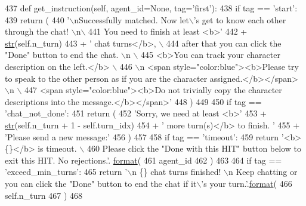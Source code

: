 \begin{DoxyCode}
437     \textcolor{keyword}{def }get\_instruction(self, agent\_id=None, tag='first'):
438         \textcolor{keywordflow}{if} tag == \textcolor{stringliteral}{'start'}:
439             \textcolor{keywordflow}{return} (
440                 \textcolor{stringliteral}{'\(\backslash\)nSuccessfully matched. Now let\(\backslash\)'s get to know each other through the chat! \(\backslash\)n\(\backslash\)}
441 \textcolor{stringliteral}{                    You need to finish at least <b>'}
442                 + \hyperlink{namespacegenerate__task__READMEs_a5b88452ffb87b78c8c85ececebafc09f}{str}(self.n\_turn)
443                 + \textcolor{stringliteral}{' chat turns</b>, \(\backslash\)}
444 \textcolor{stringliteral}{                    after that you can click the "Done" button to end the chat. \(\backslash\)n \(\backslash\)}
445 \textcolor{stringliteral}{                    <b>You can track your character description on the left.</b> \(\backslash\)}
446 \textcolor{stringliteral}{                    \(\backslash\)n <span style="color:blue"><b>Please try to speak to the other person as if you are
       the character assigned.</b></span> \(\backslash\)n \(\backslash\)}
447 \textcolor{stringliteral}{                    <span style="color:blue"><b>Do not trivially copy the character descriptions into the
       message.</b></span>'}
448             )
449 
450         \textcolor{keywordflow}{if} tag == \textcolor{stringliteral}{'chat\_not\_done'}:
451             \textcolor{keywordflow}{return} (
452                 \textcolor{stringliteral}{'Sorry, we need at least <b>'}
453                 + \hyperlink{namespacegenerate__task__READMEs_a5b88452ffb87b78c8c85ececebafc09f}{str}(self.n\_turn + 1 - self.turn\_idx)
454                 + \textcolor{stringliteral}{' more turn(s)</b> to finish. '}
455                 + \textcolor{stringliteral}{'Please send a new message:'}
456             )
457 
458         \textcolor{keywordflow}{if} tag == \textcolor{stringliteral}{'timeout'}:
459             \textcolor{keywordflow}{return} \textcolor{stringliteral}{'<b>\{\}</b> is timeout. \(\backslash\)}
460 \textcolor{stringliteral}{                    Please click the "Done with this HIT" button below to exit this HIT. No rejections.'}.
      \hyperlink{namespaceparlai_1_1chat__service_1_1services_1_1messenger_1_1shared__utils_a32e2e2022b824fbaf80c747160b52a76}{format}(
461                 agent\_id
462             )
463 
464         \textcolor{keywordflow}{if} tag == \textcolor{stringliteral}{'exceed\_min\_turns'}:
465             \textcolor{keywordflow}{return} \textcolor{stringliteral}{'\(\backslash\)n \{\} chat turns finished! \(\backslash\)n Keep chatting or you can click the "Done" button to end
       the chat if it\(\backslash\)'s your turn.'}.\hyperlink{namespaceparlai_1_1chat__service_1_1services_1_1messenger_1_1shared__utils_a32e2e2022b824fbaf80c747160b52a76}{format}(
466                 self.n\_turn
467             )
468 
\end{DoxyCode}
